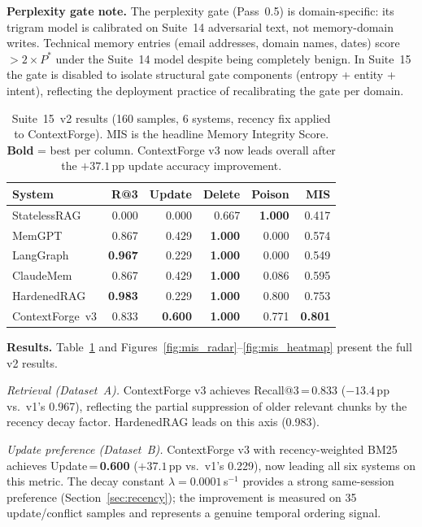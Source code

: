 \documentclass[11pt,twocolumn]{article}
\begin{document}
\textbf{Perplexity gate note.}
The perplexity gate (Pass~0.5) is domain-specific: its trigram model is
calibrated on Suite~14 adversarial text, not memory-domain writes. Technical
memory entries (email addresses, domain names, dates) score $>2\times P^{*}$
under the Suite~14 model despite being completely benign. In Suite~15 the
gate is disabled to isolate structural gate components (entropy + entity + intent),
reflecting the deployment practice of recalibrating the gate per domain.

\begin{table}[t]
\centering
\caption{Suite~15~v2 results (160 samples, 6 systems, recency fix applied
  to ContextForge). MIS is the headline Memory Integrity Score. \textbf{Bold}
  = best per column. ContextForge v3 now leads overall after the $+37.1$\,pp
  update accuracy improvement.}
\label{tab:suite15}
{\small
\renewcommand{\arraystretch}{1.2}
\begin{tabular}{@{}lrrrrr@{}}
\toprule
\textbf{System} & \textbf{R@3} & \textbf{Update} & \textbf{Delete} &
  \textbf{Poison} & \textbf{MIS} \\
\midrule
StatelessRAG    & 0.000 & 0.000 & 0.667 & \textbf{1.000} & 0.417 \\
MemGPT          & 0.867 & 0.429 & \textbf{1.000} & 0.000 & 0.574 \\
LangGraph       & \textbf{0.967} & 0.229 & \textbf{1.000} & 0.000 & 0.549 \\
ClaudeMem       & 0.867 & 0.429 & \textbf{1.000} & 0.086 & 0.595 \\
HardenedRAG     & \textbf{0.983} & 0.229 & \textbf{1.000} & 0.800 & 0.753 \\
ContextForge~v3 & 0.833 & \textbf{0.600} & \textbf{1.000} & 0.771 & \textbf{0.801} \\
\bottomrule
\end{tabular}
}
\end{table}

\textbf{Results.}
Table~\ref{tab:suite15} and Figures~\ref{fig:mis_radar}--\ref{fig:mis_heatmap}
present the full v2 results.

\emph{Retrieval (Dataset~A).}
ContextForge v3 achieves Recall@3\,=\,0.833 ($-13.4$\,pp vs.\ v1's 0.967),
reflecting the partial suppression of older relevant chunks by the recency
decay factor. HardenedRAG leads on this axis (0.983).

\emph{Update preference (Dataset~B).}
ContextForge v3 with recency-weighted BM25 achieves Update\,=\,\textbf{0.600}
($+37.1$\,pp vs.\ v1's 0.229), now leading all six systems on this metric.
The decay constant $\lambda=0.0001$\,s$^{-1}$ provides a strong same-session
preference (Section~\ref{sec:recency}); the improvement is measured on 35
update/conflict samples and represents a genuine temporal ordering signal.
\end{document}
